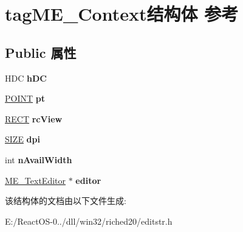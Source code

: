 \hypertarget{structtag_m_e___context}{}\section{tag\+M\+E\+\_\+\+Context结构体 参考}
\label{structtag_m_e___context}
\subsection*{Public 属性}
\begin{DoxyCompactItemize}
\item 
\mbox{\label{structtag_m_e___context_a06f4865a3b89fbe237324395297662b9}} 
H\+DC {\bfseries h\+DC}
\item 
\mbox{\label{structtag_m_e___context_ac7c4099c49458e1a09ffdb4e25811307}} 
\hyperlink{structtag_p_o_i_n_t}{P\+O\+I\+NT} {\bfseries pt}
\item 
\mbox{\label{structtag_m_e___context_a3302fe4624c4eb694f279dc4d2e2452b}} 
\hyperlink{structtag_r_e_c_t}{R\+E\+CT} {\bfseries rc\+View}
\item 
\mbox{\label{structtag_m_e___context_acaca0c0a20653e8f36d5d30dde4e07d4}} 
\hyperlink{structtag_s_i_z_e}{S\+I\+ZE} {\bfseries dpi}
\item 
\mbox{\label{structtag_m_e___context_a86a32b268082d449ce0926b3ce1ea37c}} 
int {\bfseries n\+Avail\+Width}
\item 
\mbox{\label{structtag_m_e___context_adfb675090dcd98ea11279ec1d01eb67b}} 
\hyperlink{structtag_m_e___text_editor}{M\+E\+\_\+\+Text\+Editor} $\ast$ {\bfseries editor}
\end{DoxyCompactItemize}


该结构体的文档由以下文件生成\+:\begin{DoxyCompactItemize}
\item 
E\+:/\+React\+O\+S-\/0../dll/win32/riched20/editstr.\+h\end{DoxyCompactItemize}
